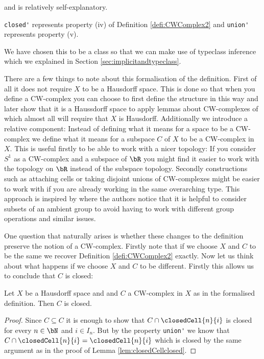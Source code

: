 and is relatively self-explanatory.  

\lstinline{closed'} represents property (iv) of Definition \ref{defi:CWComplex2} and \lstinline{union'} represents property (v).

\medskip

We have chosen this to be a class so that we can make use of typeclass inference which we explained in Section \ref{sec:implicitandtypeclass}.

There are a few things to note about this formalisation of the definition.
First of all it does not require $X$ to be a Hausdorff space.
This is done so that when you define a CW-complex you can choose to first define the structure in this way and later show that it is a Haussdorff space to apply lemmas about CW-complexes of which almost all will require that $X$ is Hausdorff.
Additionally we introduce a relative component:
Instead of defining what it means for a space to be a CW-complex we define what it means for a subspace $C$ of $X$ to be a CW-complex in $X$.
This is useful firstly to be able to work with a nicer topology:
If you consider $S^1$ as a CW-complex and a subspace of $\bR$ you might find it easier to work with the topology on $\bR$ instead of the subspace topology.
Secondly constructions such as attaching cells or taking disjoint unions of CW-complexes might be easier to work with if you are already working in the same overarching type.
This approach is inspired by \cite{Gonthier2013} where the authors notice that it is helpful to consider subsets of an ambient group to avoid having to work with different group operations and similar issues.

One question that naturally arises is whether these changes to the definition preserve the notion of a CW-complex.
Firstly note that if we choose $X$ and $C$ to be the same we recover Definition \ref{defi:CWComplex2} exactly.
Now let us think about what happens if we choose $X$ and $C$ to be different.
Firstly this allows us to conclude that $C$ is closed:

\begin{lem} \label{lem:Cclosed}
  Let $X$ be a Hausdorff space and and $C$ a CW-complex in $X$ as in the formalised definition.
  Then $C$ is closed.
  \href{https://github.com/scholzhannah/CWComplexes/blob/7be4872a05b534011cc969eb5b80a4b7f0bf57e2/CWcomplexes/Definition.lean#L234-L238}{\faExternalLink}
\end{lem}
\begin{proof}
  Since $C \subseteq C$ it is enough to show that $C \cap \closedCell{n}{i}$ is closed for every $n \in \bN$ and $i \in I_n$.
  But by the property \lstinline{union'} we know that $C \cap \closedCell{n}{i} = \closedCell{n}{i}$ which is closed by the same argument as in the proof of Lemma \ref{lem:closedCellclosed}.
\end{proof}

